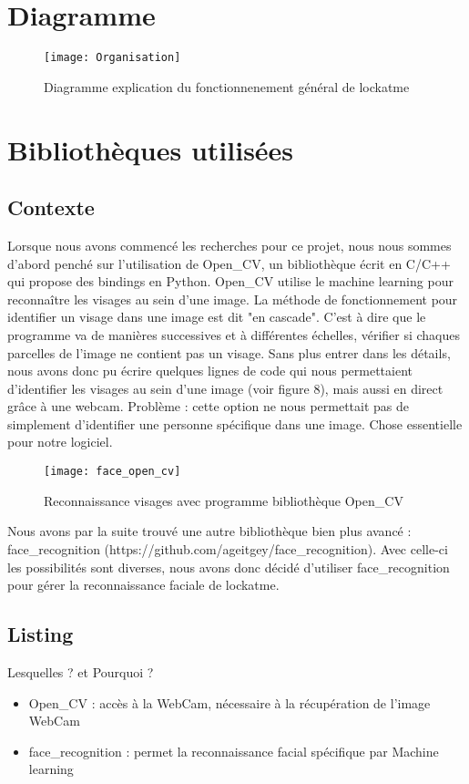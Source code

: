 \section{Diagramme}
  \begin{figure}[h]
    \texttt{[image: Organisation]}
    \caption{Diagramme explication du fonctionnenement général de lockatme}
  \end{figure}

\newpage

\section{Bibliothèques utilisées}
  \subsection{Contexte}
Lorsque nous avons commencé les recherches pour ce projet, nous nous sommes
d'abord penché sur l'utilisation de Open\_CV, un bibliothèque écrit en C/C++ qui
propose des bindings en Python. Open\_CV utilise le machine learning pour
reconnaître les visages au sein d'une image. La méthode de fonctionnement pour
identifier un visage dans une image est dit "en cascade". C'est à dire que le
programme va de manières successives et à différentes échelles, vérifier si
chaques parcelles de l'image ne contient pas un visage. Sans plus entrer dans
les détails, nous avons donc pu écrire quelques lignes de code qui nous
permettaient d'identifier les visages au sein d'une image (voir figure 8), mais aussi en direct
grâce à une webcam. Problème : cette option ne nous permettait pas de simplement
d'identifier une personne spécifique dans une image. Chose essentielle pour notre
logiciel.\\

\begin{figure}[h]
  \texttt{[image: face\_open\_cv]}
  \caption{Reconnaissance visages avec programme bibliothèque Open\_CV}
\end{figure}

\newpage

Nous avons par la suite trouvé une autre bibliothèque bien plus avancé :
face\_recognition (https://github.com/ageitgey/face\_recognition). Avec celle-ci
les possibilités sont diverses, nous avons donc décidé d'utiliser face\_recognition
pour gérer la reconnaissance faciale de lockatme.

\subsection{Listing}
Lesquelles ? et Pourquoi ?
\\
  \begin{itemize}
    \item{Open\_CV : accès à la WebCam, nécessaire à la récupération de l'image
    WebCam}
    \item{face\_recognition : permet la reconnaissance facial spécifique par
    Machine learning}
  \end{itemize}

